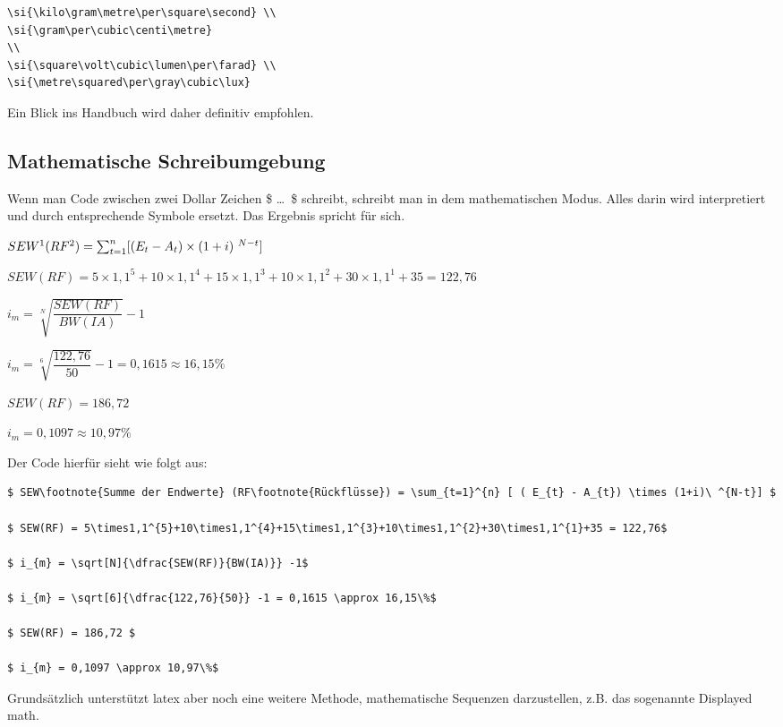 \begin{lstlisting}[float=htpb,caption=Darstellungen von Einheiten mit siunitx,label=lst:einheiten]
\si{\kilo\gram\metre\per\square\second} \\
\si{\gram\per\cubic\centi\metre}
\\
\si{\square\volt\cubic\lumen\per\farad} \\
\si{\metre\squared\per\gray\cubic\lux}
\end{lstlisting}

Ein Blick ins Handbuch wird daher definitiv empfohlen.
\subsection{Mathematische Schreibumgebung}%
\label{sec:math-umg}
Wenn man Code zwischen zwei Dollar Zeichen \$ \dots\ \$ schreibt, schreibt man in dem mathematischen Modus. Alles darin wird interpretiert und durch entsprechende Symbole ersetzt. Das Ergebnis spricht für sich.

$ SEW\footnote{Summe der Endwerte} (RF\footnote{Rückflüsse}) = \sum_{t=1}^{n} [ ( E_{t} - A_{t}) \times (1+i)\ ^{N-t}] $

$ SEW(RF) = 5\times1,1^{5}+10\times1,1^{4}+15\times1,1^{3}+10\times1,1^{2}+30\times1,1^{1}+35 = 122,76$

$ i_{m} = \sqrt[N]{\dfrac{SEW(RF)}{BW(IA)}} -1$

$ i_{m} = \sqrt[6]{\dfrac{122,76}{50}} -1 = 0,1615 \approx 16,15\%$

$ SEW(RF) = 186,72 $

$ i_{m} = 0,1097 \approx 10,97\%$

Der Code hierfür sieht wie folgt aus:
\begin{lstlisting}[float=htpb,caption=Darstellungen von mathematischen Formeln,label=lst:inlinemath]
$ SEW\footnote{Summe der Endwerte} (RF\footnote{Rückflüsse}) = \sum_{t=1}^{n} [ ( E_{t} - A_{t}) \times (1+i)\ ^{N-t}] $

$ SEW(RF) = 5\times1,1^{5}+10\times1,1^{4}+15\times1,1^{3}+10\times1,1^{2}+30\times1,1^{1}+35 = 122,76$

$ i_{m} = \sqrt[N]{\dfrac{SEW(RF)}{BW(IA)}} -1$

$ i_{m} = \sqrt[6]{\dfrac{122,76}{50}} -1 = 0,1615 \approx 16,15\%$

$ SEW(RF) = 186,72 $

$ i_{m} = 0,1097 \approx 10,97\%$
\end{lstlisting}

Grundsätzlich unterstützt \gls{latex} aber noch eine weitere Methode, mathematische Sequenzen darzustellen, z.B. das sogenannte \glqq Displayed math\grqq.

